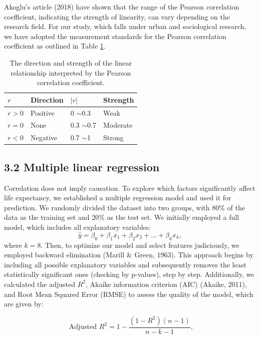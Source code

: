 \documentclass[a4paper,12pt]{article}
\begin{document}
Akoglu's article (2018) have shown that the range of the Pearson correlation coefficient, indicating the strength of linearity, can vary depending on the research field. For our study, which falls under urban and sociological research, we have adopted the measurement standards for the Pearson correlation coefficient as outlined in Table \ref{tab: 3.1}.

\begin{table}[h]
\centering
\begin{tabular}{|l|l|l|l|}
\hline
$r$     & Direction & $|r|$ & Strength \\ \hline
$r > 0$ & Positive  & 0 $\sim$0.3    & Weak     \\ \hline
$r = 0$ & None      & 0.3 $\sim$0.7  & Moderate \\ \hline
$r < 0$ & Negative  & 0.7 $\sim$1    & Strong   \\ \hline
\end{tabular}
\caption[]{
The direction and strength of the linear relationship interpreted by the Pearson correlation coefficient.
}
\label{tab: 3.1}
\end{table}



\subsection*{3.2 Multiple linear regression}
Correlation does not imply causation. To explore which factors significantly affect life expectancy, we established a multiple regression model and used it for prediction. We randomly divided the dataset into two groups, with 80\% of the data as the training set and 20\% as the test set. We initially employed a full model, which includes all explanatory variables:
\begin{equation*}
\hat{y}=\beta_0+\beta_1 x_1+\beta_2 x_2+\ldots+\beta_k x_k,
\end{equation*}
where $k = 8$. Then, to optimize our model and select features judiciously, we employed backward elimination (Marill \& Green, 1963). This approach begins by including all possible explanatory variables and subsequently removes the least statistically significant ones (checking by p-values), step by step. Additionally, we calculated the adjusted $R^2$, Akaike information criterion (AIC) (Akaike, 2011), and Root Mean Squared Error (RMSE) to assess the quality of the model, which are given by:

\begin{equation*}
\text { Adjusted } R^2=1-\frac{\left(1-R^2\right)(n-1)}{n-k-1},
\end{equation*}
\end{document}
